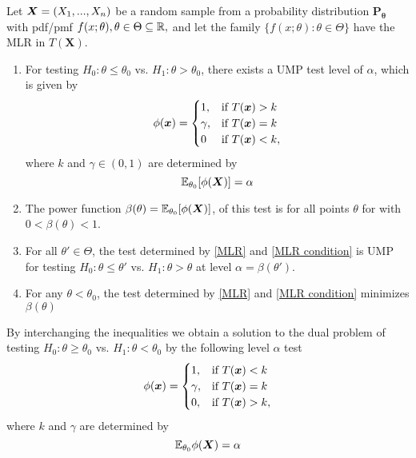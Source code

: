    Let $\boldsymbol{X} = (X_1,...,X_n)$ be a random sample from a probability distribution $\boldsymbol{P_{\theta}}$ with pdf/pmf $f(x;\theta), \theta \in \Theta \subseteq \mathbb R,$ and let the family $\{f(x;\theta): \theta \in \Theta\}$ have the MLR in $T(\boldsymbol{X})$.
    \begin{enumerate}[(1)]
        \item For testing $H_0: \theta \leq \theta_0$ vs. $H_1:\theta > \theta_0$, there exists a UMP test level of $\alpha$, which is given by
        \begin{equation}\label{MLR}
            \phi(\boldsymbol{x}) = 
            \begin{cases}
                1, & \text{if } T(\boldsymbol{x}) > k \\
                \gamma, & \text{if } T(\boldsymbol{x}) =  k \\
                0 & \text{if } T(\boldsymbol{x}) < k, \\
            \end{cases}
        \end{equation}
        where $k$ and $\gamma \in (0,1)$ are determined by 
        \begin{equation}\label{MLR condition}
            \mathbb E_{\theta_0}[\phi(\boldsymbol{X})] = \alpha
        \end{equation}
        \item The power function $\beta(\theta) = \mathbb E_{\theta_0}[\phi(\boldsymbol{X})]$, of this test is  for all points $\theta$ for with $0< \beta(\theta) < 1$.
        \item For all $\theta' \in \Theta$, the test determined by \ref{MLR} and \ref{MLR condition} is UMP for testing $H_0: \theta \leq \theta'$ vs. $H_1: \theta > \theta$ at level $\alpha = \beta(\theta').$
        \item For any $\theta < \theta_0$, the test determined by \ref{MLR} and \ref{MLR condition} minimizes $\beta(\theta)$
    \end{enumerate}

By interchanging the inequalities we obtain a solution to the dual problem of testing $H_0: \theta \geq \theta_0$ vs. $H_1:\theta < \theta_0$ by the following level $\alpha$ test 
    \begin{equation}
        \phi(\boldsymbol{x}) = 
        \begin{cases}
            1, & \text{if } T(\boldsymbol{x}) < k \\
            \gamma, & \text{if } T(\boldsymbol{x}) =  k \\
            0, & \text{if } T(\boldsymbol{x}) > k, \\
        \end{cases}
    \end{equation}
where $k$ and $\gamma$ are determined by 
\begin{equation}
    \mathbb E_{\theta_0}\phi(\boldsymbol{X}) = \alpha 
\end{equation}

